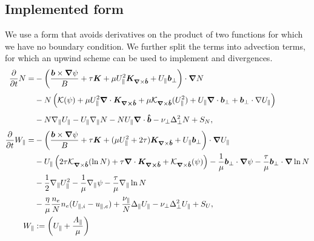 \subsection{Implemented form}
We use a form that avoids derivatives on the product of two
functions for which we have no boundary condition.
We further split the terms into advection terms, for which an upwind scheme can be
used to implement and divergences.
\begin{subequations}
    \begin{align}
    \frac{\partial}{\partial t} N =&
        -\left( \frac{\vec b\times\vn \psi}{B}
        + \tau \vec K + \mu U_\parallel^2 \vec K_{\vn\times\bhat} +
        U_\parallel {\vec b}_\perp
    \right)\cn N
\nonumber \\ &
    \vphantom{\frac{\vec b\times\vn \psi}{B}} %
        - N \left( \mathcal K(\psi)
           +\mu U_\parallel^2\nc \vec{ K_{\vn\times\bhat}}
        +\mu \mathcal K_{\vn\times\bhat}(U_\parallel^2)
        + U_\parallel \nc { \vec b}_\perp
    + {\vec b}_\perp\cdot\nabla U_\parallel \right)
\nonumber \\&
    \vphantom{\frac{\vec b\times\vn \psi}{B}} %
    - N\npar U_\parallel - U_\parallel \npar N - NU_\parallel \nc \bhat
    - \nu_\perp\Delta_\perp^2 N + S_N
    , \label{eq:EgyrofluidN}\\
    \frac{\partial}{\partial t} W_\parallel =&
      -\left( \frac{\vec b\times\vn \psi}{B}
          + \tau \vec K + (\mu U_\parallel^2 + 2\tau) \vec K_{\vn\times\bhat} +
        U_\parallel {\vec b}_\perp
    \right)\cn U_\parallel
\nonumber \\&
    \vphantom{\frac{\vec b\times\vn \psi}{B}} %
    - U_\parallel \left( 2\tau \mathcal K_{\vn\times\bhat}(\ln N)
        +\tau \nc\vec{ K_{\vn\times\bhat}}
        + \mathcal K_{\vn\times\bhat}(\psi)
        \right)
        - \frac{1}{\mu} {\vec b}_\perp\cn \psi%
        -\frac{\tau}{\mu} {\vec b}_\perp\cn \ln N
\nonumber \\&
    \vphantom{\frac{\vec b\times\vn \psi}{B}} %
        - \frac{1}{2}\npar U_\parallel^2
        - \frac{1}{\mu} \npar \psi%
        -\frac{\tau}{\mu} \npar \ln N
\nonumber \\&
\vphantom{\frac{\vec b\times\vn \psi}{B}} %
        - \frac{\eta}{\mu} \frac{n_e}{N}n_e(U_{\parallel,i} - u_{\parallel,e})
    + \frac{\nu_\parallel}{N} \Delta_\parallel U_\parallel - \nu_\perp\Delta_\perp^2 U_\parallel
    + S_U
    ,
        \label{eq:EgyrofluidU} \\
        W_\parallel&:= \left( U_\parallel + \frac{A_\parallel}{\mu}\right)
    \end{align}
    \label{eq:Egyrofluid}
\end{subequations}
